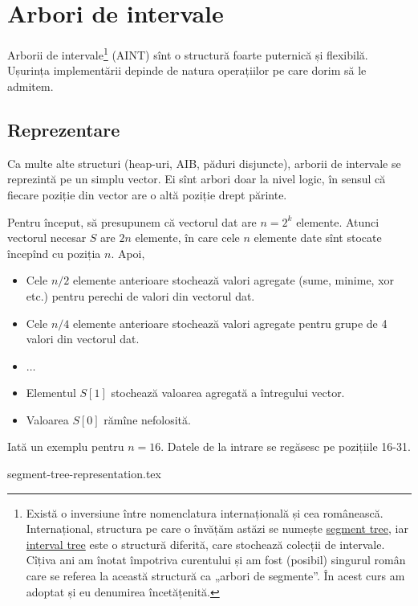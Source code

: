 \documentclass[../main.tex]{subfiles}
\begin{document}
\chapter{Arbori de intervale}

Arborii de intervale\footnote{Există o inversiune între nomenclatura internațională și cea românească. Internațional, structura pe care o învățăm astăzi se numește \href{https://cp-algorithms.com/data_structures/segment_tree.html}{segment tree}, iar \href{https://en.wikipedia.org/wiki/Interval_tree}{interval tree} este o structură diferită, care stochează colecții de intervale. Cîțiva ani am înotat împotriva curentului și am fost (posibil) singurul român care se referea la această structură ca „arbori de segmente”. În acest curs am adoptat și eu denumirea încetățenită.
} (AINT) sînt o structură foarte puternică și flexibilă. Ușurința implementării depinde de natura operațiilor pe care dorim să le admitem.

\section{Reprezentare}

Ca multe alte structuri (heap-uri, AIB, păduri disjuncte), arborii de intervale se reprezintă pe un simplu vector. Ei sînt arbori doar la nivel logic, în sensul că fiecare poziție din vector are o altă poziție drept părinte.

Pentru început, să presupunem că vectorul dat are $n = 2^k$ elemente. Atunci vectorul necesar $S$ are $2n$ elemente, în care cele $n$ elemente date sînt stocate începînd cu poziția $n$. Apoi,

\begin{itemize}
  \item Cele $n/2$ elemente anterioare stochează valori agregate (sume, minime, xor etc.) pentru perechi de valori din vectorul dat.
  \item Cele $n/4$ elemente anterioare stochează valori agregate pentru grupe de 4 valori din vectorul dat.
  \item $\dots$
  \item Elementul $S[1]$ stochează valoarea agregată a întregului vector.
  \item Valoarea $S[0]$ rămîne nefolosită.
\end{itemize}

Iată un exemplu pentru $n = 16$. Datele de la intrare se regăsesc pe pozițiile 16-31.

{segment-tree-representation.tex}
\end{document}
